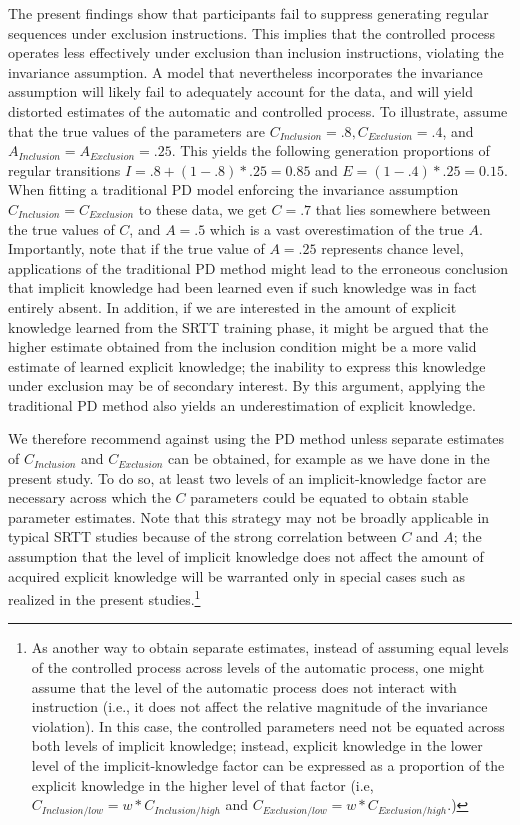 \documentclass[floatsintext,man]{apa6}
\begin{document}
The present findings show that participants fail to suppress generating
regular sequences under exclusion instructions. This implies that the
controlled process operates less effectively under exclusion than
inclusion instructions, violating the invariance assumption. A model
that nevertheless incorporates the invariance assumption will likely
fail to adequately account for the data, and will yield distorted
estimates of the automatic and controlled process. To illustrate, assume
that the true values of the parameters are
\(C_{Inclusion} = .8, C_{Exclusion} = .4\), and
\(A_{Inclusion} = A_{Exclusion} = .25\). This yields the following
generation proportions of regular transitions
\(I = .8 + (1-.8)*.25 = 0.85\) and \(E = (1-.4)*.25 = 0.15\). When
fitting a traditional PD model enforcing the invariance assumption
\(C_{Inclusion} = C_{Exclusion}\) to these data, we get \(C=.7\) that
lies somewhere between the true values of \(C\), and \(A = .5\) which is
a vast overestimation of the true \(A\). Importantly, note that if the
true value of \(A=.25\) represents chance level, applications of the
traditional PD method might lead to the erroneous conclusion that
implicit knowledge had been learned even if such knowledge was in fact
entirely absent. In addition, if we are interested in the amount of
explicit knowledge learned from the SRTT training phase, it might be
argued that the higher estimate obtained from the inclusion condition
might be a more valid estimate of learned explicit knowledge; the
inability to express this knowledge under exclusion may be of secondary
interest. By this argument, applying the traditional PD method also
yields an underestimation of explicit knowledge.

We therefore recommend against using the PD method unless separate
estimates of \(C_{Inclusion}\) and \(C_{Exclusion}\) can be obtained,
for example as we have done in the present study. To do so, at least two
levels of an implicit-knowledge factor are necessary across which the
\(C\) parameters could be equated to obtain stable parameter estimates.
Note that this strategy may not be broadly applicable in typical SRTT
studies because of the strong correlation between \(C\) and \(A\); the
assumption that the level of implicit knowledge does not affect the
amount of acquired explicit knowledge will be warranted only in special
cases such as realized in the present studies.\footnote{As another way
  to obtain separate estimates, instead of assuming equal levels of the
  controlled process across levels of the automatic process, one might
  assume that the level of the automatic process does not interact with
  instruction (i.e., it does not affect the relative magnitude of the
  invariance violation). In this case, the controlled parameters need
  not be equated across both levels of implicit knowledge; instead,
  explicit knowledge in the lower level of the implicit-knowledge factor
  can be expressed as a proportion of the explicit knowledge in the
  higher level of that factor (i.e,
  \(C_{Inclusion/low} = w*C_{Inclusion/high}\) and
  \(C_{Exclusion/low} = w*C_{Exclusion/high}\).)}
\end{document}

